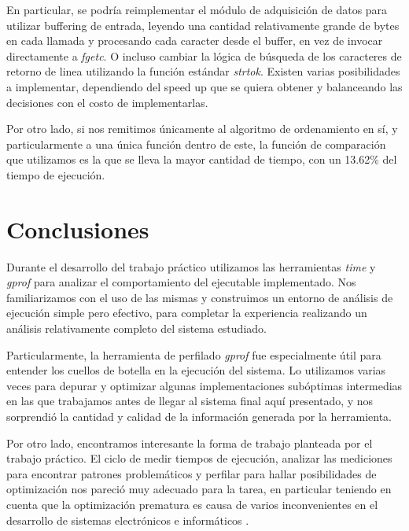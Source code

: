 \documentclass[a4paper,11pt]{article}
\begin{document}
En particular, se podría reimplementar el módulo de adquisición de datos para
utilizar buffering de entrada, leyendo una cantidad relativamente grande de
bytes en cada llamada y procesando cada caracter desde el buffer, en vez de
invocar directamente a \textit{fgetc}. O incluso cambiar la lógica de búsqueda
de los caracteres de retorno de linea utilizando la función estándar
\textit{strtok}. Existen varias posibilidades a implementar, dependiendo del
speed up que se quiera obtener y balanceando las decisiones con el costo de
implementarlas.

Por otro lado, si nos remitimos únicamente al algoritmo de ordenamiento en sí,
y particularmente a una única función dentro de este, la función de comparación
que utilizamos es la que se lleva la mayor cantidad de tiempo, con un 13.62\%
del tiempo de ejecución.

\section{Conclusiones}

Durante el desarrollo del trabajo práctico utilizamos las herramientas
\textit{time} y \textit{gprof} para analizar el comportamiento del ejecutable
implementado. Nos familiarizamos con el uso de las mismas y construimos un
entorno de análisis de ejecución simple pero efectivo, para completar la
experiencia realizando un análisis relativamente completo del sistema
estudiado.

Particularmente, la herramienta de perfilado \textit{gprof} fue especialmente
útil para entender los cuellos de botella en la ejecución del sistema. Lo
utilizamos varias veces para depurar y optimizar algunas implementaciones
subóptimas intermedias en las que trabajamos antes de llegar al sistema final
aquí presentado, y nos sorprendió la cantidad y calidad de la información
generada por la herramienta.

Por otro lado, encontramos interesante la forma de trabajo planteada por el
trabajo práctico. El ciclo de medir tiempos de ejecución, analizar las
mediciones para encontrar patrones problemáticos y perfilar para hallar
posibilidades de optimización nos pareció muy adecuado para la tarea, en
particular teniendo en cuenta que la optimización prematura es causa de varios
inconvenientes en el desarrollo de sistemas electrónicos e informáticos
\cite{OPT}.
\end{document}
